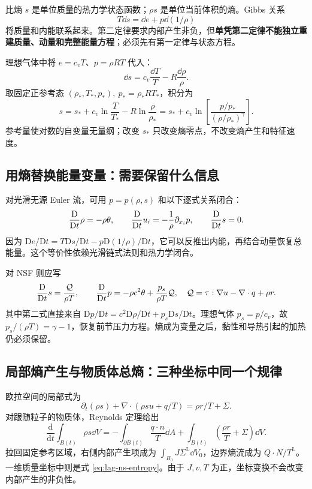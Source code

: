 比熵 $s$ 是单位质量的热力学状态函数；$\rho s$ 是单位当前体积的熵。Gibbs 关系
\begin{equation}
 T\dd s=\dd e+p\dd(1/\rho)
\end{equation}
将质量和内能联系起来。第二定律要求内部产生非负，但\textbf{单凭第二定律不能独立重建质量、动量和完整能量方程}；必须先有第一定律与状态方程。

理想气体中将 $e=c_vT$、$p=\rho RT$ 代入：
\begin{equation}
 \dd s=c_v\frac{\dd T}{T}-R\frac{\dd\rho}{\rho}.
\end{equation}
取固定正参考态 $(\rho_*,T_*,p_*),\ p_*=\rho_*RT_*$，积分为
\begin{equation}
 s=s_*+c_v\ln\frac T{T_*}-R\ln\frac\rho{\rho_*}
 =s_*+c_v\ln\left[\frac{p/p_*}{(\rho/\rho_*)^\gamma}\right].
 \label{eq:physical-entropy-reference}
\end{equation}
参考量使对数的自变量无量纲；改变 $s_*$ 只改变熵零点，不改变熵产生和特征速度。

\subsection{用熵替换能量变量：需要保留什么信息}

对光滑无源 Euler 流，可用 $p=p(\rho,s)$ 和以下逐式关系闭合：
\begin{equation}
 \frac{\mathrm D}{\mathrm Dt}\rho=-\rho\theta,\qquad
 \frac{\mathrm D}{\mathrm Dt} u_i=-\frac1\rho\partial_{x_i}p,\qquad
 \frac{\mathrm D}{\mathrm Dt} s=0.
\end{equation}
因为 $\mathrm De/\mathrm Dt=T\mathrm Ds/\mathrm Dt-p\mathrm D(1/\rho)/\mathrm Dt$，它可以反推出内能，再结合动量恢复总能量。这个等价性依赖光滑链式法则和热力学闭合。

对 NSF 则应写
\begin{equation}
 \frac{\mathrm D}{\mathrm Dt} s=\frac{\mathcal Q}{\rho T},\qquad
 \frac{\mathrm D}{\mathrm Dt} p=-\rho c^2\theta+\frac{p_s}{\rho T}\mathcal Q,
 \quad \mathcal Q=\tau:\nabla u-\nabla\cdot q+\rho r.
 \label{eq:entropy-pressure-general}
\end{equation}
其中第二式直接来自 $\mathrm Dp/\mathrm Dt=c^2\mathrm D\rho/\mathrm Dt+p_s\mathrm Ds/\mathrm Dt$。理想气体 $p_s=p/c_v$，故 $p_s/(\rho T)=\gamma-1$，恢复前节压力方程。熵成为变量之后，黏性和导热引起的加热仍必须保留。

\subsection{局部熵产生与物质体总熵：三种坐标中同一个规律}

欧拉空间的局部式为
\begin{equation}
 \partial_t(\rho s)+\nabla\cdot(\rho s u+q/T)=\rho r/T+\Sigma.
\end{equation}
对跟随粒子的物质体，Reynolds 定理给出
\begin{equation}
 \frac{\mathrm d}{\mathrm dt}\int_{B(t)}\rho s\dd V
 =-\int_{\partial B(t)}\frac{q\cdot n}{T}\dd A
 +\int_{B(t)}\left(\frac{\rho r}{T}+\Sigma\right)\dd V.
\end{equation}
拉回固定参考区域，右侧内部产生项成为 $\int_{B_0}J\Sigma^{\mathrm L}\dd V_0$，边界熵流成为 $Q\cdot N/T^{\mathrm L}$。一维质量坐标中则是式 \eqref{eq:lag-ns-entropy}。由于 $J,v,T$ 为正，坐标变换不会改变内部产生的非负性。

